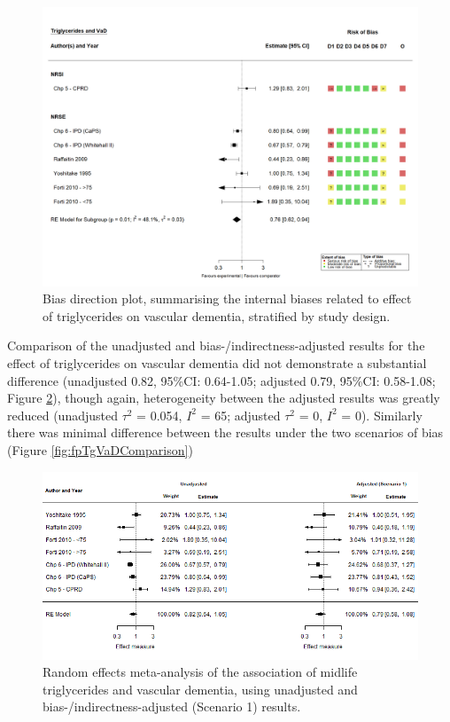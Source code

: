 \documentclass[a4paper, twoside]{templates/ociamthesis}
\begin{document}
\begin{figure}[H]
\includegraphics[width=1\linewidth]{figures/tri/midlife_VaD} \caption[shortcap]{Bias direction plot, summarising the internal biases related to effect of triglycerides on vascular dementia, stratified by study design.}\label{fig:tgVadBiasDirection}
\end{figure}

Comparison of the unadjusted and bias-/indirectness-adjusted results for the effect of triglycerides on vascular dementia did not demonstrate a substantial difference (unadjusted 0.82, 95\%CI: 0.64-1.05; adjusted 0.79, 95\%CI: 0.58-1.08; Figure \ref{fig:fpTgVad}), though again, heterogeneity between the adjusted results was greatly reduced (unadjusted \(\tau^2\) = 0.054, \(I^2\) = 65; adjusted \(\tau^2\) = 0, \(I^2\) = 0). Similarly there was minimal difference between the results under the two scenarios of bias (Figure \ref{fig:fpTgVaDComparison})





\begin{figure}[H]
\includegraphics[width=1\linewidth]{figures/tri/fp_paired_midlife_tg_vad} \caption[shortcap]{Random effects meta-analysis of the association of midlife triglycerides and vascular dementia, using unadjusted and bias-/indirectness-adjusted (Scenario 1) results.}\label{fig:fpTgVad}
\end{figure}
\end{document}
